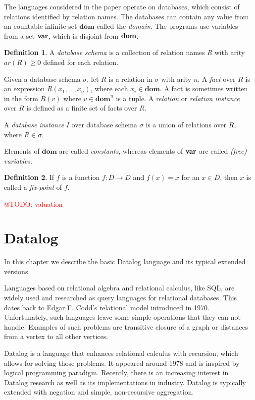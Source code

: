 \documentclass{pracamgr}
\makeatletter
\theoremstyle{plain}
\theoremstyle{definition}
\newtheorem{defn}{Definition}[section]
\theoremstyle{remark}
\newcommand{\todo}[1]{\textcolor{red}{@TODO: #1}}
\makeatother
\begin{document}
The languages considered in the paper operate on databases, which consist of relations identified by relation names. The databases can contain any value from an countable infinite set $\textbf{dom}$ called the \emph{domain}. The programs use variables from a set $\bf{var}$, which is disjoint from $\bf{dom}$.

\begin{defn}
A \emph{database schema} is a collection of relation names $R$ with arity $ar(R) \ge 0$ defined for each relation.

Given a database schema $\sigma$, let $R$ is a relation in $\sigma$ with arity $n$. A \emph{fact} over $R$ is an expression $R(x_1 , \dots , x_n)$, where each $x_i \in \textbf{dom}$. A fact is sometimes written in the form $R(v)$ where $v \in \textbf{dom}^n$ is a tuple. A \emph{relation} or \emph{relation instance} over $R$ is defined as a finite set of facts over $R$.

A \emph{database instance} $I$ over database schema $\sigma$ is a union of relations over $R$, where $R \in \sigma$.

Elements of $\bm{dom}$ are called \emph{constants}, whereas elements of $\bf{var}$ are called \emph{(free) variables}.
\end{defn}

\begin{defn}
If $f$ is a function $f: D \to D$ and $f(x) = x$ for an $x \in D$, then $x$ is called a \emph{fix-point} of $f$.
\end{defn}

\todo{valuation}


\chapter{Datalog}\label{r:datalog}

In this chapter we describe the basic Datalog language and its typical extended versions.

Languages based on relational algebra and relational calculus, like SQL, are widely used and researched as query languages for relational databases. This dates back to Edgar F. Codd's relational model \cite{coddrelmodel} introduced in 1970. Unfortunately, such languages leave some simple operations that they can not handle. Examples of such problems are transitive closure of a graph or distances from a vertex to all other vertices.

Datalog is a language that enhances relational calculus with recursion, which allows for solving those problems. It appeared around 1978 and is inspired by logical programming paradigm. Recently, there is an increasing interest in Datalog research as well as its implementations in industry. Datalog is typically extended with negation and simple, non-recursive aggregation.
\end{document}
